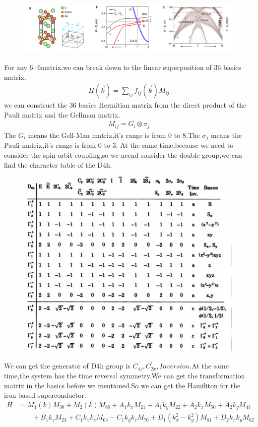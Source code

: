 \documentclass[5pt]{article}
\begin{document}
\begin{figure}[ht]
	\centering
	\includegraphics[scale=0.6]{figure/4}
	\caption{\cite{zhang2019multiple}}
	\label{}
\end{figure}


For any $6\cdot 6$matrix,we can break down to the linear superposition of 36 basics matrix.
\begin{align}
	H(\vec{k})=\sum_{ij}f_{ij}(\vec{k})M_{ij}
\end{align}
we can construct the 36 basics Hermitian matrix from the direct product of the Pauli matrix and the Gellman matrix.
\begin{align}
	M_{ij}=G_i\otimes \sigma_j
\end{align}
The $G_i$ means the Gell-Man matrix,it's range is from 0 to 8.The $\sigma_j$ means the Pauli matrix,it's range is from 0 to 3. 
At the same time,because we need to consider the spin orbit coupling,so we neend sonsider the double group,we can find the character table of the D4h.
\begin{figure}[H]
	\centering
	\includegraphics[scale=0.8]{figure/1}
	\caption{}
	\label{}
\end{figure}
We can get the generator of D4h group is $C_{4z},C_{2x}^{'},Inversion$.At the same time,the system has the time reversal symmetry.We can get the transformation matrix in the basics before we mentioned.So we can get the Hamiliton for the iron-based superconductor.
\begin{align}
	\nonumber
	H&=M_1(k)M_{30}+M_2(k)M_{80}+A_1k_xM_{21}+A_1k_yM_{22}+A_2k_xM_{50}+A_2k_yM_{43}
	\\
	\nonumber  &\qquad +B_1k_zM_{23}+C_1k_xk_zM_{63}-C_1k_yk_zM_{70}+D_1(k_x^2-k_y^2)M_{61}+D_2k_xk_yM_{62}
\end{align}
\end{document}
